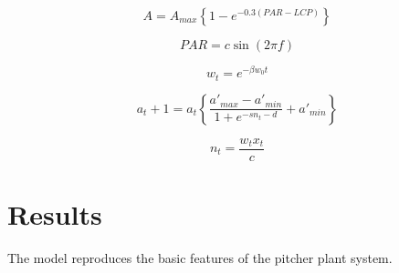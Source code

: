 \documentclass[a0,landscape]{a0poster}
\begin{document}
\begin{multicols}{4}
\begin{equation}
  A = A_{max} \left\{ 1 - e^{-0.3 (PAR - LCP)} \right\} 
  \label{eqn:photosynthesis}
\end{equation}

\begin{equation}
PAR = c \sin(2 \pi f)
\label{eqn:PAR}
\end{equation}

\begin{equation}
w_t = e^{-\beta w_0 t}
\label{eqn:decomp}
\end{equation}

\begin{equation}
a_t+1 = a_t \left\{ \frac{a'_{max}-a'_{min}}{1+e^{-s n_t - d}} + a'_{min}\right\}
\label{eqn:oxygenation}
\end{equation}

\begin{equation}
n_t = \frac{w_t x_t}{c}
\label{eqn:nutrients}
\end{equation}









\section*{Results}


\begin{block}{The model reproduces the basic features of the pitcher plant system.}


\end{block}
\end{multicols}
\end{document}
